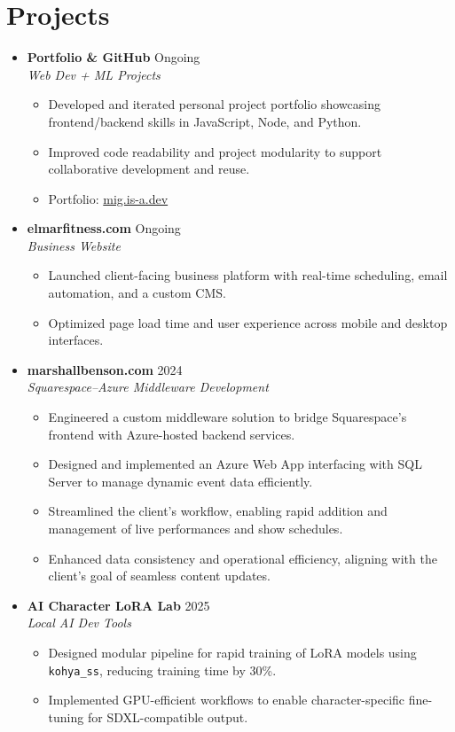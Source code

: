 \documentclass[letterpaper,10pt]{article}
\newcommand{\resumeItem}[1]{\item\small{#1}}
\begin{document}
\section*{Projects}
\begin{itemize}[leftmargin=0.15in]
  \item
    \textbf{Portfolio \& GitHub} \hfill Ongoing \\
    \textit{Web Dev + ML Projects}
    \begin{itemize}
      \resumeItem{Developed and iterated personal project portfolio showcasing frontend/backend skills in JavaScript, Node, and Python.}
      \resumeItem{Improved code readability and project modularity to support collaborative development and reuse.}
      \resumeItem{Portfolio: \href{https://mig.is-a.dev}{mig.is-a.dev}}
    \end{itemize}

  \item
    \textbf{elmarfitness.com} \hfill Ongoing \\
    \textit{Business Website}
    \begin{itemize}
      \resumeItem{Launched client-facing business platform with real-time scheduling, email automation, and a custom CMS.}
      \resumeItem{Optimized page load time and user experience across mobile and desktop interfaces.}
    \end{itemize}

    \item
    \textbf{marshallbenson.com} \hfill 2024 \\
    \textit{Squarespace–Azure Middleware Development}
    \begin{itemize}
      \resumeItem{Engineered a custom middleware solution to bridge Squarespace's frontend with Azure-hosted backend services.}
      \resumeItem{Designed and implemented an Azure Web App interfacing with SQL Server to manage dynamic event data efficiently.}
      \resumeItem{Streamlined the client's workflow, enabling rapid addition and management of live performances and show schedules.}
      \resumeItem{Enhanced data consistency and operational efficiency, aligning with the client's goal of seamless content updates.}
    \end{itemize}
    
  \item
    \textbf{AI Character LoRA Lab} \hfill 2025 \\
    \textit{Local AI Dev Tools}
    \begin{itemize}
      \resumeItem{Designed modular pipeline for rapid training of LoRA models using \texttt{kohya\_ss}, reducing training time by 30\%.}
      \resumeItem{Implemented GPU-efficient workflows to enable character-specific fine-tuning for SDXL-compatible output.}
    \end{itemize}
\end{itemize}
\end{document}
